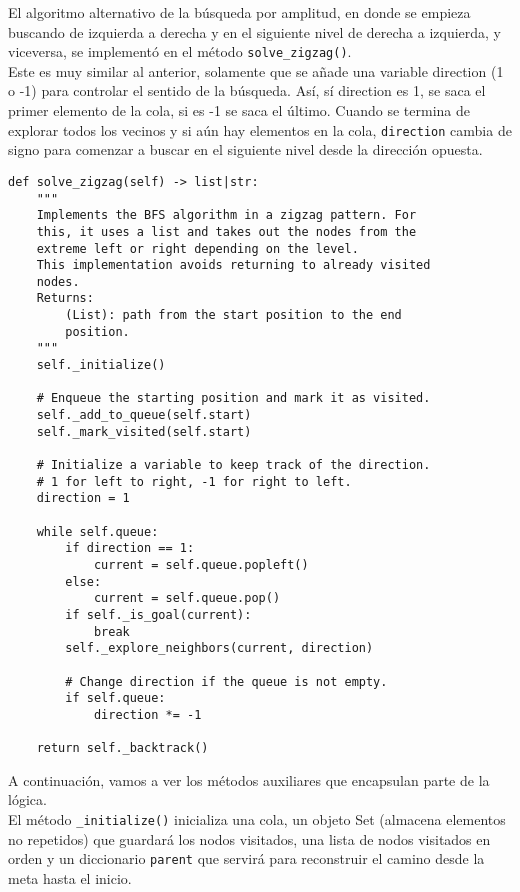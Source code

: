 \clearpage
El algoritmo alternativo de la búsqueda por amplitud, en donde se empieza buscando de izquierda a derecha y en el siguiente nivel de derecha a izquierda, y viceversa, se implementó en el método \lstinline{solve_zigzag()}.
\\\newline
Este es muy similar al anterior, solamente que se añade una variable direction (1 o -1) para controlar el sentido de la búsqueda. Así, sí direction es 1, se saca el primer elemento de la cola, si es -1 se saca el último. Cuando se termina de explorar todos los vecinos y si aún hay elementos en la cola, \lstinline{direction} cambia de signo para comenzar a buscar en el siguiente nivel desde la dirección opuesta.
\clearpage
\begin{lstlisting}
def solve_zigzag(self) -> list|str:
    """
    Implements the BFS algorithm in a zigzag pattern. For
    this, it uses a list and takes out the nodes from the
    extreme left or right depending on the level.
    This implementation avoids returning to already visited
    nodes.
    Returns:
        (List): path from the start position to the end
        position.
    """
    self._initialize()

    # Enqueue the starting position and mark it as visited.
    self._add_to_queue(self.start)
    self._mark_visited(self.start)

    # Initialize a variable to keep track of the direction.
    # 1 for left to right, -1 for right to left.
    direction = 1

    while self.queue:
        if direction == 1:
            current = self.queue.popleft()
        else:
            current = self.queue.pop()
        if self._is_goal(current):
            break
        self._explore_neighbors(current, direction)

        # Change direction if the queue is not empty.
        if self.queue:
            direction *= -1

    return self._backtrack()
\end{lstlisting}
\clearpage
A continuación, vamos a ver los métodos auxiliares que encapsulan parte de la lógica.\\\newline
El método \lstinline{_initialize()} inicializa una cola, un objeto Set (almacena elementos no repetidos) que guardará los nodos visitados, una lista de nodos visitados en orden y un diccionario \lstinline{parent} que servirá para reconstruir el camino desde la meta hasta el inicio.\\

